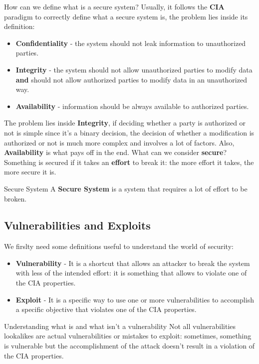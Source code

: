 How can we define what is a secure system? 
Usually, it follows the \textbf{CIA} paradigm to correctly define what a 
secure system is, the problem lies inside its definition:
\begin{itemize}
    \item \textbf{Confidentiality} - the system should not leak information to 
        unauthorized parties.
    \item \textbf{Integrity} - the system should not allow unauthorized parties 
        to modify data \textbf{and} should not allow authorized parties 
        to modify data in an unauthorized way.
    \item \textbf{Availability} - information should be always available 
        to authorized parties.
\end{itemize}
The problem lies inside \textbf{Integrity}, if deciding whether a party is
authorized or not is simple since it's a binary decision, the decision of
whether a modification is authorized or not is much more complex and involves
a lot of factors. Also, \textbf{Availability} is what pays off in the end.
What can we consider \textbf{secure}? Something is secured if it takes
an \textbf{effort} to break it: the more effort it takes, the more secure 
it is.
\begin{key}{Secure System}
    A \textbf{Secure System} is a system that requires a lot of effort to be 
    broken.
\end{key}
\subsection{Vulnerabilities and Exploits}
We firslty need some definitions useful to understand the world of security:
\begin{itemize}
    \item \textbf{Vulnerability} - It is a shortcut that allows an attacker
        to break the system with less of the intended effort: it is something 
        that allows to violate one of the CIA properties.
    \item \textbf{Exploit} - It is a specific way to use one or more
        vulnerabilities to accomplish a specific objective that violates
        one of the CIA properties.
\end{itemize}
\begin{warning}{Understanding what is and what isn't a vulnerability}
    Not all vulnerabilities lookalikes are actual vulnerabilities or mistakes
    to exploit: sometimes, something is vulnerable but the accomplishment of 
    the attack doesn't result in a violation of the CIA properties.  
\end{warning}
